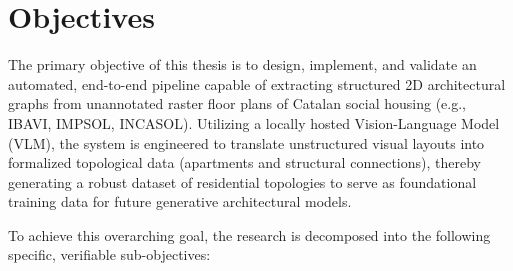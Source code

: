 \documentclass[12pt,a4paper,openright]{report}
\begin{document}
\section{Objectives}

The primary objective of this thesis is to design, implement, and validate an automated, end-to-end pipeline capable of extracting structured 2D architectural graphs from unannotated raster floor plans of Catalan social housing (e.g., IBAVI, IMPSOL, INCASOL). Utilizing a locally hosted Vision-Language Model (VLM), the system is engineered to translate unstructured visual layouts into formalized topological data (apartments and structural connections), thereby generating a robust dataset of residential topologies to serve as foundational training data for future generative architectural models.

To achieve this overarching goal, the research is decomposed into the following specific, verifiable sub-objectives:
\end{document}
